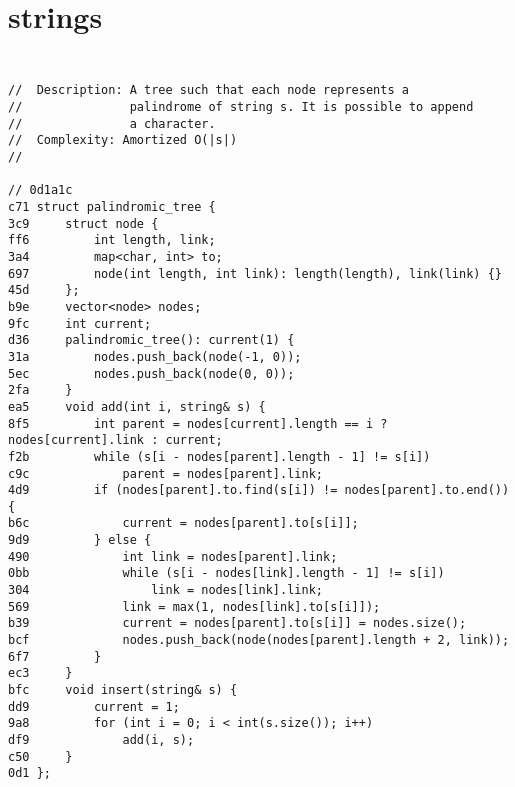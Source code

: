 \documentclass[11pt, a4paper, twoside]{article}
\begin{document}
%
%

\section{strings}

\subsection{}
\begin{lstlisting}

//  Description: A tree such that each node represents a 
//               palindrome of string s. It is possible to append
//               a character.
//  Complexity: Amortized O(|s|)
//

// 0d1a1c
c71 struct palindromic_tree {
3c9     struct node {
ff6         int length, link;
3a4         map<char, int> to;
697         node(int length, int link): length(length), link(link) {}
45d     };
b9e     vector<node> nodes;
9fc     int current;
d36     palindromic_tree(): current(1) {
31a         nodes.push_back(node(-1, 0));
5ec         nodes.push_back(node(0, 0));
2fa     }
ea5     void add(int i, string& s) {
8f5         int parent = nodes[current].length == i ? nodes[current].link : current;
f2b         while (s[i - nodes[parent].length - 1] != s[i])
c9c             parent = nodes[parent].link;
4d9         if (nodes[parent].to.find(s[i]) != nodes[parent].to.end()) {
b6c             current = nodes[parent].to[s[i]];
9d9         } else {
490             int link = nodes[parent].link;
0bb             while (s[i - nodes[link].length - 1] != s[i])
304                 link = nodes[link].link;
569             link = max(1, nodes[link].to[s[i]]);
b39             current = nodes[parent].to[s[i]] = nodes.size();
bcf             nodes.push_back(node(nodes[parent].length + 2, link));
6f7         }
ec3     }
bfc     void insert(string& s) {
dd9         current = 1;
9a8         for (int i = 0; i < int(s.size()); i++)
df9             add(i, s);
c50     }
0d1 };
\end{lstlisting}
\end{document}
